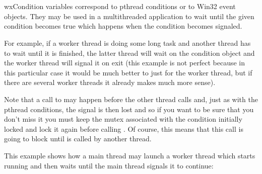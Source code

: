 \section{}\label{wxcondition}

wxCondition variables correspond to pthread conditions or to Win32 event
objects. They may be used in a multithreaded application to wait until the
given condition becomes true which happens when the condition becomes signaled.

For example, if a worker thread is doing some long task and another thread has
to wait until it is finished, the latter thread will wait on the condition
object and the worker thread will signal it on exit (this example is not
perfect because in this particular case it would be much better to just 
 for the worker thread, but if there are several
worker threads it already makes much more sense).

Note that a call to  may happen before the
other thread calls  and, just as with the
pthread conditions, the signal is then lost and so if you want to be sure that
you don't miss it you must keep the mutex associated with the condition
initially locked and lock it again before calling 
. Of course, this means that this call is
going to block until  is called by another
thread.


This example shows how a main thread may launch a worker thread which starts
running and then waits until the main thread signals it to continue:

